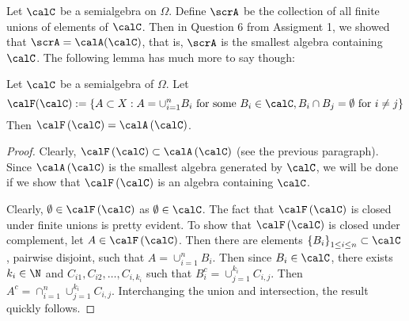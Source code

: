 Let $\calC$ be a semialgebra on $\Omega$. Define $\scrA$ be the collection of all finite unions of elements of $\calC$. Then in Question 6 from Assigment 1, we showed that $\scrA = \calA (\calC)$, that is, $\scrA$ is the smallest algebra containing $\calC$.
The following lemma has much more to say though:

\begin{lemma}
Let $\calC$ be a semialgebra of $\Omega$. Let $$\calF (\calC) := \left\{ A \subset X: A= \cup_{i=1}^{n} B_i \text{ for some } B_i \in \calC, B_i \cap B_j = \emptyset \text{ for } i\ne j\right\}$$
Then $\calF \left( \calC \right) = \calA \left( \calC \right)$.
    \label{lemma:disjoint-algebra-generated}
\end{lemma}
\begin{proof}
    Clearly, $\calF \left( \calC \right) \subset \calA \left( \calC \right)$ (see the previous paragraph). Since $\calA \left( \calC \right)$ is the smallest algebra generated by $\calC$, we will be done if we show that $\calF \left( \calC \right)$ is an algebra containing $\calC$. 

    Clearly, $\emptyset \in \calF \left( \calC \right)$ as $\emptyset \in \calC$. The fact that $\calF \left( \calC \right)$ is closed under finite unions is pretty evident. To show that $\calF \left( \calC \right)$ is closed under complement, let $A\in \calF \left( \calC \right)$. Then there are elements $\left\{ B_i \right\}_{1\le i \le n} \subset \calC$, pairwise disjoint, such that $A=\cup_{i=1}^{n} B_i$. Then since $B_i \in \calC$, there exists $k_i \in \N$ and $C_{i1} , C_{i2} , \ldots , C_{i,k_i}$ such that $B_i ^c = \cup_{j=1}^{k_i} C_{i,j}$. Then $A^c=\cap_{i=1}^{n} \cup_{j=1}^{k_i} C_{i,j}$. Interchanging the union and intersection, the result quickly follows.
\end{proof}


